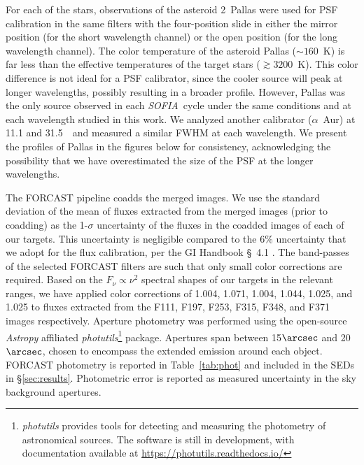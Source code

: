 \documentclass[modern]{aastex61}
\newcommand{\SOFIA}{{\it SOFIA}}
\begin{document}
For each of the stars, observations of the asteroid 2~Pallas were used for PSF calibration in the same filters with the four-position slide in either the mirror position (for the short wavelength channel) or the open position (for the long wavelength channel).  The color temperature of the asteroid Pallas ($\sim160$~K) is far less than the effective temperatures of the target stars ($\gtrsim3200$~K).  This color difference is not ideal for a PSF calibrator, since the cooler source will peak at longer wavelengths, possibly resulting in a broader profile.  However, Pallas was the only source observed in each \SOFIA\ cycle under the same conditions and at each wavelength studied in this work.  We analyzed another calibrator ($\alpha$~Aur) at 11.1 and 31.5~\micron\ and measured a similar FWHM at each wavelength.  We present the profiles of Pallas in the figures below for consistency, acknowledging the possibility that we have overestimated the size of the PSF at the longer wavelengths.

The FORCAST pipeline coadds the merged images.  We use the standard deviation of the mean of fluxes extracted from the merged images (prior to coadding) as the 1-$\sigma$ uncertainty of the fluxes in the coadded images of each of our targets.   This uncertainty is negligible compared to the 6\% uncertainty that we adopt for the flux calibration, per the GI Handbook \S~4.1 \citep{herter2013}.  The band-passes of the selected FORCAST filters are such that only small color corrections are required.  Based on the $F_{\nu}\propto\nu^{2}$ spectral shapes of our targets in the relevant ranges, we have applied color corrections of 1.004, 1.071, 1.004, 1.044, 1.025, and 1.025 to fluxes extracted from the F111, F197, F253, F315, F348, and F371 images respectively.  Aperture photometry was performed using the open-source \textit{Astropy} \citep{astropy2013} affiliated \textit{photutils}\footnote{\footnotesize{\textit{photutils} provides tools for detecting and measuring the photometry of astronomical sources. The software is still in development, with documentation available at \url{https://photutils.readthedocs.io/}}} package. Apertures span between 15$\arcsec$ and 20$\arcsec$, chosen to encompass the extended emission around each object. FORCAST photometry is reported in Table~\ref{tab:phot} and included in the SEDs in \S\ref{sec:results}. Photometric error is reported as measured uncertainty in the sky background apertures.




\end{document}

